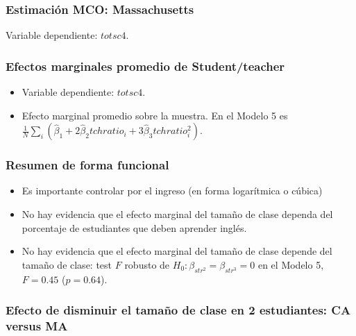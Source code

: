 \documentclass[t, compress, spanish, aspectratio=169]{beamer}
\begin{document}
\begin{frame}
    \frametitle{Estimaci\'on MCO: Massachusetts}
    \small
    Variable dependiente: $totsc4$.
    \begin{center}
    \fontsize{7}{8}\selectfont
    \setlength{\tabcolsep}{2pt}
    
    \end{center}
\end{frame}
\begin{frame}
    \frametitle{Efectos marginales promedio de Student/teacher}
    \small
    \begin{itemize}
        \item Variable dependiente: $totsc4$.
        \item Efecto marginal promedio sobre la muestra. En el Modelo 5 es $\frac{1}{N}\sum_i(\hat\beta_1+2\hat\beta_2 tchratio_i+3\hat\beta_3 tchratio_i^2)$.
    \end{itemize}
    \begin{center}
    \small
    
    \end{center}
\end{frame}
\begin{frame}
    \frametitle{Resumen de forma funcional}
    \begin{itemize}
        \item Es importante controlar por el ingreso (en forma logar\'itmica o c\'ubica)
        \item No hay evidencia que el efecto marginal del tama\~no de clase dependa del porcentaje de estudiantes que deben aprender ingl\'es.
        \item No hay evidencia que el efecto marginal del tama\~no de clase depende del tama\~no de clase: test $F$ robusto de $H_0:\beta_{str^2}=\beta_{str^3}=0$ en el Modelo 5, $F=0.45$ ($p=0.64$).
    \end{itemize}
\end{frame}
\begin{frame}
    \frametitle{Efecto de disminuir el tama\~no de clase en 2 estudiantes: CA versus MA}
    \begin{center}
    \small
    
    \end{center}
\end{frame}
\end{document}
